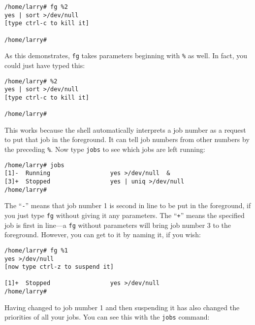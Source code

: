 \begin{screen}\begin{verbatim}
/home/larry# fg %2
yes | sort >/dev/null
[type ctrl-c to kill it]

/home/larry#
\end{verbatim}\end{screen}

        As this demonstrates, {\tt fg} takes parameters beginning with
{\tt \%} as well.  In fact, you could just have typed this:

\begin{screen}\begin{verbatim}
/home/larry# %2
yes | sort >/dev/null
[type ctrl-c to kill it]

/home/larry#
\end{verbatim}\end{screen}

        This works because the shell automatically interprets a job
number as a request to put that job in the foreground.  It can tell
job numbers from other numbers by the preceding \index{\%} {\tt \%}.
Now type {\tt jobs} to see which jobs are left running:

\begin{screen}\begin{verbatim}
/home/larry# jobs
[1]-  Running                 yes >/dev/null  &
[3]+  Stopped                 yes | uniq >/dev/null
/home/larry#
\end{verbatim}
\end{screen}
        
The ``{\tt -}'' means that job number 1 is
second in line to be put in the foreground, if you just type {\tt fg}
without giving it any parameters.  The ``{\tt +}'' means the specified job
is first in line---a {\tt fg} without parameters will bring job number
3 to the foreground.  However, you can get to it by
naming it, if you wish:

\begin{screen}\begin{verbatim}
/home/larry# fg %1
yes >/dev/null 
[now type ctrl-z to suspend it]

[1]+  Stopped                 yes >/dev/null
/home/larry#
\end{verbatim}
\end{screen}

Having changed to job number 1 and then suspending it has also changed
the priorities of all your jobs.  You can see this with the {\tt jobs}
command:


